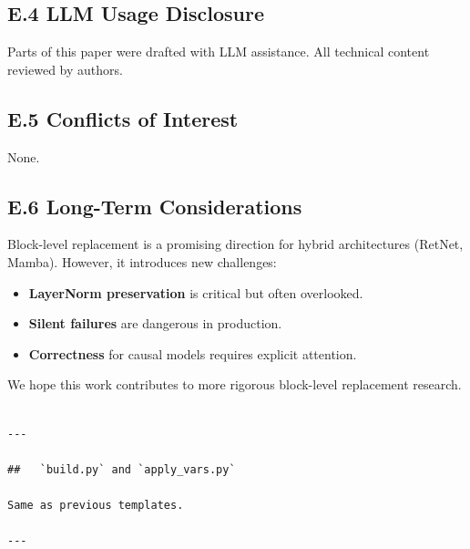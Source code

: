 \subsection{E.4 LLM Usage Disclosure}

Parts of this paper were drafted with LLM assistance. All technical content 
reviewed by authors.

\subsection{E.5 Conflicts of Interest}

None.

\subsection{E.6 Long-Term Considerations}

Block-level replacement is a promising direction for hybrid architectures 
(RetNet, Mamba). However, it introduces new challenges:

\begin{itemize}
\item \textbf{LayerNorm preservation} is critical but often overlooked.
\item \textbf{Silent failures} are dangerous in production.
\item \textbf{Correctness} for causal models requires explicit attention.

\end{itemize}
We hope this work contributes to more rigorous block-level replacement 
research.
\begin{lstlisting}

---

##   `build.py` and `apply_vars.py`

Same as previous templates.

---
\end{lstlisting}